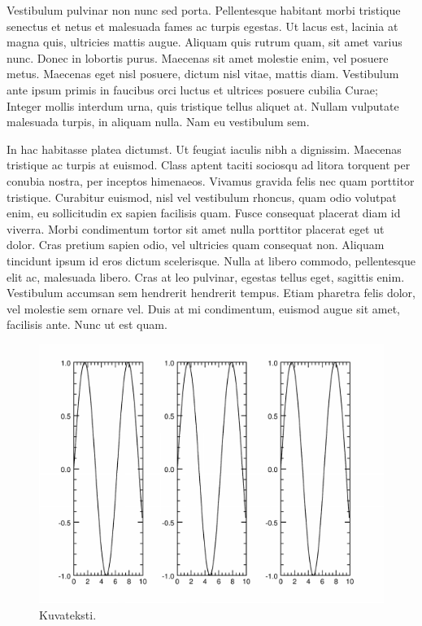 \documentclass[12pt,a4paper,titlepage]{article}
\begin{document}
Vestibulum pulvinar non nunc sed porta. Pellentesque habitant morbi tristique senectus et netus et malesuada fames ac turpis egestas. Ut lacus est, lacinia at magna quis, ultricies mattis augue. Aliquam quis rutrum quam, sit amet varius nunc. Donec in lobortis purus. Maecenas sit amet molestie enim, vel posuere metus. Maecenas eget nisl posuere, dictum nisl vitae, mattis diam. Vestibulum ante ipsum primis in faucibus orci luctus et ultrices posuere cubilia Curae; Integer mollis interdum urna, quis tristique tellus aliquet at. Nullam vulputate malesuada turpis, in aliquam nulla. Nam eu vestibulum sem.

In hac habitasse platea dictumst. Ut feugiat iaculis nibh a dignissim. Maecenas tristique ac turpis at euismod. Class aptent taciti sociosqu ad litora torquent per conubia nostra, per inceptos himenaeos. Vivamus gravida felis nec quam porttitor tristique. Curabitur euismod, nisl vel vestibulum rhoncus, quam odio volutpat enim, eu sollicitudin ex sapien facilisis quam. Fusce consequat placerat diam id viverra. Morbi condimentum tortor sit amet nulla porttitor placerat eget ut dolor. Cras pretium sapien odio, vel ultricies quam consequat non. Aliquam tincidunt ipsum id eros dictum scelerisque. Nulla at libero commodo, pellentesque elit ac, malesuada libero. Cras at leo pulvinar, egestas tellus eget, sagittis enim. Vestibulum accumsan sem hendrerit hendrerit tempus. Etiam pharetra felis dolor, vel molestie sem ornare vel. Duis at mi condimentum, euismod augue sit amet, facilisis ante. Nunc ut est quam.

\begin{figure}
	\centering
	\includegraphics[scale=0.5]{sini.pdf}
	\caption{Kuvateksti.}
\end{figure}
\end{document}
